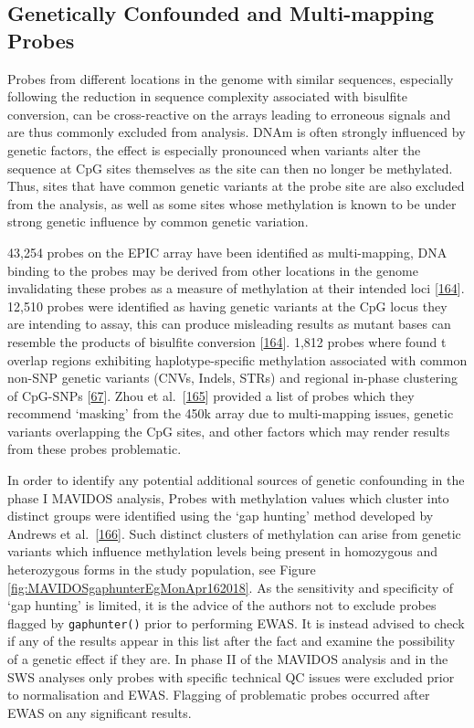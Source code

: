 \documentclass[
]{book}
\begin{document}
\hypertarget{genetically-confounded-and-multi-mapping-probes}{%
\subsection{Genetically Confounded and Multi-mapping Probes}\label{genetically-confounded-and-multi-mapping-probes}}

Probes from different locations in the genome with similar sequences, especially following the reduction in sequence complexity associated with bisulfite conversion, can be cross-reactive on the arrays leading to erroneous signals and are thus commonly excluded from analysis.
DNAm is often strongly influenced by genetic factors, the effect is especially pronounced when variants alter the sequence at CpG sites themselves as the site can then no longer be methylated.
Thus, sites that have common genetic variants at the probe site are also excluded from the analysis, as well as some sites whose methylation is known to be under strong genetic influence by common genetic variation.

43,254 probes on the EPIC array have been identified as multi-mapping, DNA binding to the probes may be derived from other locations in the genome invalidating these probes as a measure of methylation at their intended loci {[}\protect\hyperlink{ref-Pidsley2016}{164}{]}.
12,510 probes were identified as having genetic variants at the CpG locus they are intending to assay, this can produce misleading results as mutant bases can resemble the products of bisulfite conversion {[}\protect\hyperlink{ref-Pidsley2016}{164}{]}.
1,812 probes where found t overlap regions exhibiting haplotype-specific methylation associated with common non-SNP genetic variants (CNVs, Indels, STRs) and regional in-phase clustering of CpG-SNPs {[}\protect\hyperlink{ref-Bell2017a}{67}{]}.
Zhou et al.~{[}\protect\hyperlink{ref-Zhou2017}{165}{]} provided a list of probes which they recommend `masking' from the 450k array due to multi-mapping issues, genetic variants overlapping the CpG sites, and other factors which may render results from these probes problematic.

In order to identify any potential additional sources of genetic confounding in the phase I MAVIDOS analysis, Probes with methylation values which cluster into distinct groups were identified using the `gap hunting' method developed by Andrews et al.~{[}\protect\hyperlink{ref-Andrews2016}{166}{]}.
Such distinct clusters of methylation can arise from genetic variants which influence methylation levels being present in homozygous and heterozygous forms in the study population, see Figure \ref{fig:MAVIDOSgaphunterEgMonApr162018}.
As the sensitivity and specificity of `gap hunting' is limited, it is the advice of the authors not to exclude probes flagged by \texttt{gaphunter()} prior to performing EWAS.
It is instead advised to check if any of the results appear in this list after the fact and examine the possibility of a genetic effect if they are.
In phase II of the MAVIDOS analysis and in the SWS analyses only probes with specific technical QC issues were excluded prior to normalisation and EWAS.
Flagging of problematic probes occurred after EWAS on any significant results.
\end{document}
